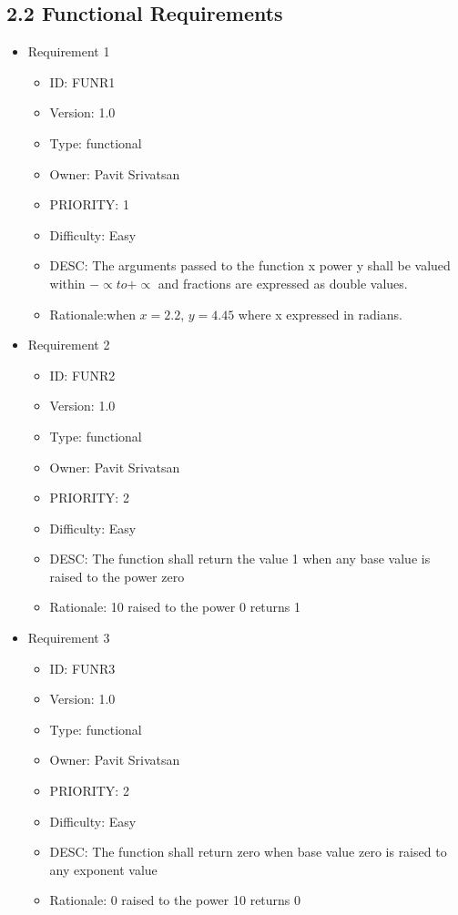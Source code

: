 \documentclass{article}
\begin{document}
\subsection*{2.2 Functional Requirements}
\begin{itemize}
\item Requirement 1
\begin{itemize}
\item ID:       FUNR1
\item Version:  1.0
\item Type:     functional
\item Owner:    Pavit Srivatsan
\item PRIORITY: 1 
\item Difficulty: Easy
\item DESC: The arguments passed to the function x power y shall be valued within $-\propto to +\propto$ and fractions are expressed as double values.
\item Rationale:when $x=2.2$, $ y = 4.45$ where x expressed in radians.
\end{itemize}
\item Requirement 2
\begin{itemize}
\item ID:       FUNR2
\item Version:  1.0
\item Type:     functional
\item Owner:    Pavit Srivatsan
\item PRIORITY: 2 
\item Difficulty: Easy
\item DESC:  The function shall return the value 1 when any base value is raised to the power zero
\item Rationale: 10 raised to the power 0 returns 1
\end{itemize}
\item Requirement 3
\begin{itemize}
\item ID:       FUNR3
\item Version:  1.0
\item Type:     functional
\item Owner:    Pavit Srivatsan
\item PRIORITY: 2
\item Difficulty: Easy
\item DESC: The function shall return zero when base value zero is raised to any exponent value
\item Rationale: 0 raised to the power 10 returns 0

\end{itemize}
\end{itemize}
\end{document}
